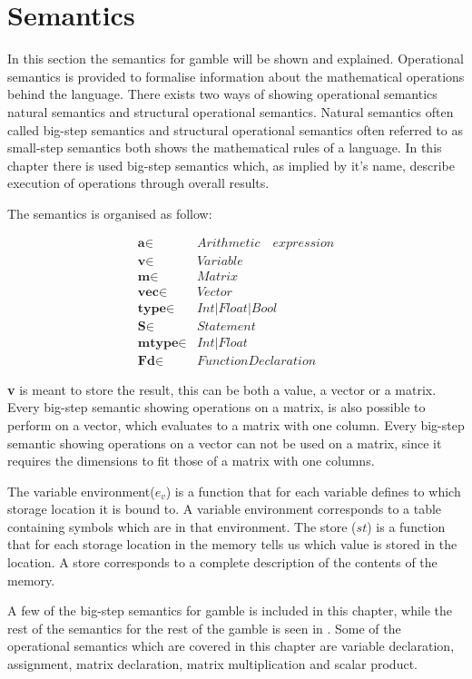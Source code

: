 \chapter{Semantics}
In this section the semantics for \gls{gamble} will be shown and explained.
Operational semantics is provided to formalise information about the mathematical operations behind the language.
There exists two ways of showing operational semantics natural semantics and structural operational semantics.
Natural semantics often called big-step semantics and structural operational semantics often referred to as small-step semantics both shows the mathematical rules of a language. 
In this chapter there is used big-step semantics which, as implied by it's name, describe execution of operations through overall results.

The semantics is organised as follow:

\begin{align*}
	\textbf{a} \in  &Arithmetic\quad expression\\
	\textbf{v} \in  &Variable\\
	\textbf{m} \in  &Matrix\\
	\textbf{vec} \in  &Vector\\
	\textbf{type} \in &Int | Float | Bool\\
	\textbf{S}	\in &Statement\\
	\textbf{mtype} \in &Int | Float\\
	\textbf{Fd}		\in &Function Declaration
\end{align*}

\textbf{v} is meant to store the result, this can be both a value, a vector or a matrix.
Every big-step semantic showing operations on a matrix, is also possible to perform on a vector, which evaluates to a matrix with one column.
Every big-step semantic showing operations on a vector can not be used on a matrix, since it requires the dimensions to fit those of a matrix with one columns.

The variable environment(${ e }_{ v }$) is a function that for each variable defines to which storage location it is bound to. A variable environment corresponds to a table containing symbols which are in that environment.
The store ($st$) is a function that for each storage location in the memory tells us which value is stored in the location. A store corresponds to a complete description of the contents of the memory.\citep{EnvSt_Semantics}

A few of the big-step semantics for \gls{gamble} is included in this chapter, while the rest of the semantics for the rest of the \gls{gamble} is seen in .
Some of the operational semantics which are covered in this chapter are variable declaration, assignment, matrix declaration, matrix multiplication and scalar product.

